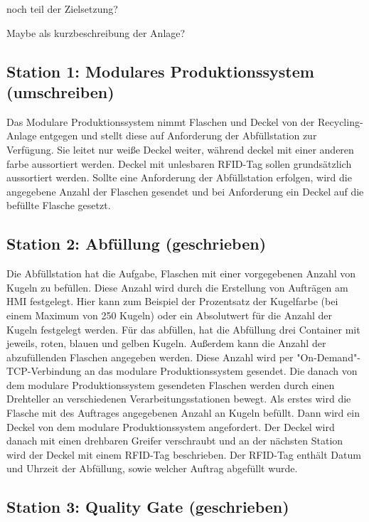 noch teil der Zielsetzung?

Maybe als kurzbeschreibung der Anlage?

\subsection{Station 1: Modulares Produktionssystem (umschreiben)}\label{sec:Station 1: Modulares Produktionssystem}

Das Modulare Produktionssystem nimmt Flaschen und Deckel von der Recycling-Anlage entgegen und stellt diese auf Anforderung 
der Abfüllstation zur Verfügung. Sie leitet nur weiße Deckel weiter, während deckel mit einer anderen farbe aussortiert 
werden. Deckel mit unlesbaren RFID-Tag sollen grundsätzlich aussortiert werden. Sollte eine Anforderung der Abfüllstation 
erfolgen, wird die angegebene Anzahl der Flaschen gesendet und bei Anforderung ein Deckel auf die befüllte Flasche gesetzt.

\subsection{Station 2: Abfüllung (geschrieben)}\label{sec:Station 2: Abfüllung}

Die Abfüllstation hat die Aufgabe, Flaschen mit einer vorgegebenen Anzahl von Kugeln zu befüllen. Diese Anzahl wird durch 
die Erstellung von Aufträgen am HMI festgelegt. Hier kann zum Beispiel der Prozentsatz der Kugelfarbe (bei einem Maximum 
von 250 Kugeln) oder ein Absolutwert für die Anzahl der Kugeln festgelegt werden. Für das abfüllen, hat die Abfüllung drei 
Container mit jeweils, roten, blauen und gelben Kugeln. Außerdem kann die Anzahl der abzufüllenden Flaschen angegeben 
werden. Diese Anzahl wird per "On-Demand"-TCP-Verbindung an das modulare Produktionssystem gesendet. Die danach von dem 
modulare Produktionssystem gesendeten Flaschen werden durch einen Drehteller an verschiedenen Verarbeitungsstationen bewegt. 
Als erstes wird die Flasche mit des Auftrages angegebenen Anzahl an Kugeln befüllt. Dann wird ein Deckel von dem modulare 
Produktionssystem angefordert. Der Deckel wird danach mit einen drehbaren Greifer verschraubt und an der nächsten Station 
wird der Deckel mit einem RFID-Tag beschrieben. Der RFID-Tag enthält Datum und Uhrzeit der Abfüllung, sowie welcher Auftrag 
abgefüllt wurde.

\subsection{Station 3: Quality Gate (geschrieben)}\label{sec:Station 3: Quality Gate}

